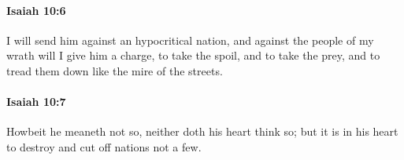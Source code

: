 		\paragraph{Isaiah 10:6} %
			\label{ISAIAH-10-6}

			I will send him against an hypocritical nation, and against the people of my wrath will I give him a charge, to take the spoil, and to take the prey, and to tread them down like the mire of the streets.


		\paragraph{Isaiah 10:7} %
			\label{ISAIAH-10-7}

			Howbeit he meaneth not so, neither doth his heart think so; but it is in his heart to destroy and cut off nations not a few.


